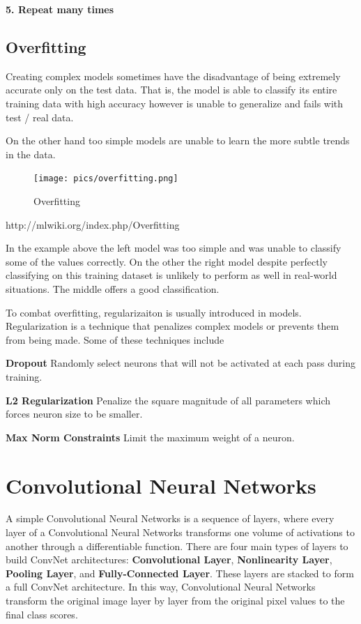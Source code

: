 \documentclass[twoside]{article}
\begin{document}
\textbf{5. Repeat many times}

\subsection{Overfitting}
Creating complex models sometimes have the disadvantage of being extremely accurate only on the test data. That is, the model is able to classify its entire training data with high accuracy however is unable to generalize and fails with test / real data.

On the other hand too simple models are unable to learn the more subtle trends in the data.

\begin{figure}[!htb]
\centering
\texttt{[image: pics/overfitting.png]}
\caption{Overfitting\cite{}}
\label{fig:Overfitting}
\end{figure}
http://mlwiki.org/index.php/Overfitting

In the example above the left model was too simple and was unable to classify some of the values correctly. On the other the right model despite perfectly classifying on this training dataset is unlikely to perform as well in real-world situations. The middle offers a good classification.

To combat overfitting, regularizaiton is usually introduced in models. Regularization is a technique that penalizes complex models or prevents them from being made. Some of these techniques include

\textbf{Dropout}
Randomly select neurons that will not be activated at each pass during training.

\textbf{L2 Regularization}
Penalize the square magnitude of all parameters which forces neuron size to be smaller.

\textbf{Max Norm Constraints}
Limit the maximum weight of a neuron.


\section{Convolutional Neural Networks}
A simple Convolutional Neural Networks is a sequence of layers, where every layer of a Convolutional Neural Networks transforms one volume of activations to another through a differentiable function. There are four main types of layers to build ConvNet architectures: \textbf{Convolutional Layer}, \textbf{Nonlinearity Layer}, \textbf{Pooling Layer}, and \textbf{Fully-Connected Layer}. These layers are stacked to form a full ConvNet architecture. In this way, Convolutional Neural Networks transform the original image layer by layer from the original pixel values to the final class scores.
\end{document}
